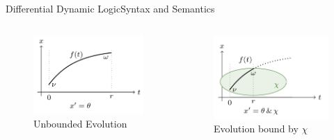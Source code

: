 \documentclass{beamer}
\begin{document}
\begin{frame}{Differential Dynamic Logic}{Syntax and Semantics}
  \begin{columns}[c]
      \begin{figure}
        \centering
        \includegraphics[scale=0.47]{unbounded-evolution}
      \caption{Unbounded Evolution}
      \end{figure}
      \begin{figure}
        \centering
        \includegraphics[scale=0.45]{bounded-evolution}
      \caption{Evolution bound by $\chi$}
    \end{figure}
    \end{columns}
\end{frame}
\end{document}
